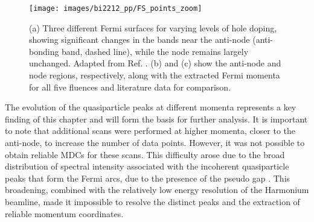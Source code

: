 \begin{figure}[t]
	\centering
	\texttt{[image: images/bi2212\_pp/FS\_points\_zoom]}
	\caption{(a) Three different Fermi surfaces for varying levels of hole doping, showing significant changes in the bands near the anti-node (anti-bonding band, dashed line), while the node remains largely unchanged. Adapted from Ref. \cite{drozdov_phase_2018}. (b) and (c) show the anti-node and node regions, respectively, along with the extracted Fermi momenta for all five fluences and literature data for comparison.}
	\label{fig:FS_points_zoom}
\end{figure}


The evolution of the quasiparticle peaks at different momenta represents a key finding of this chapter and will form the basis for further analysis.
It is important to note that additional scans were performed at higher momenta, closer to the anti-node, to increase the number of data points.
However, it was not possible to obtain reliable MDCs for these scans.
This difficulty arose due to the broad distribution of spectral intensity associated with the incoherent quasiparticle peaks that form the Fermi arcs, due to the presence of the pseudo gap \cite{norman_destruction_1998}.
This broadening, combined with the relatively low energy resolution of the Harmonium beamline, made it impossible to resolve the distinct peaks and the extraction of reliable momentum coordinates.

